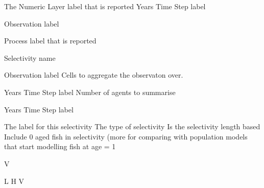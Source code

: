 {The Numeric Layer label that is reported}
 {Years}
 {Time Step label}
\par\textbf{}\par
{} {Observation label}
\par\textbf{}\par
{} {Process label that is reported}
\par\textbf{}\par
{} {Selectivity name}
\par\textbf{}\par
{} {Observation label}
 {Cells to aggregate the observaton over.}
\par\textbf{}\par
\par\textbf{}\par
{} {Years}
 {Time Step label}
 {Number of agents to summarise}
\par\textbf{}\par
\par\textbf{}\par
{} {Years}
 {Time Step label}
\par\par
{} {The label for this selectivity}
 {The type of selectivity}
 {Is the selectivity length based}
 {Include 0 aged fish in selectivity (more for comparing with population models that start modelling fish at age = 1}
\par\textbf{}\par
{} {V}
\par\textbf{}\par
{} {L}
 {H}
 {V}
\par\textbf{}\par
